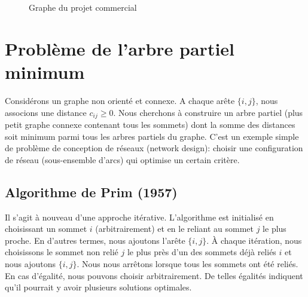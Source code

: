 \begin{example}
\begin{table}[htb]
\begin{center}
\label{tab:project}
\end{center}
\end{table}
\begin{figure}[htb]
\begin{center}
\caption{Graphe du projet commercial}
\label{fig:project}
\end{center}
\end{figure}
\end{example}

\section{Problème de l'arbre partiel minimum}

Considérons un graphe non orienté et connexe.
A chaque arête $\lbrace i,j \rbrace$, nous associons une distance $c_{ij} \geq 0$.
Nous cherchons à construire un arbre partiel (plus petit graphe connexe contenant tous les sommets) dont
la somme des distances soit minimum parmi tous les arbres partiels du graphe.
C'est un exemple simple de problème de conception de réseaux (network design): choisir une
configuration de réseau (sous-ensemble d'arcs) qui optimise un certain critère.

\subsection{Algorithme de Prim (1957)}

Il s'agit à nouveau d'une approche itérative.
L'algorithme est initialisé en choisissant un sommet $i$ (arbitrairement) et en le reliant au sommet $j$ le plus proche.
En d'autres termes, nous ajoutons l'arête $\lbrace i,j \rbrace$.
À chaque itération, nous choisissons le sommet non relié $j$ le plus près d'un des sommets déjà reliés $i$ et nous ajoutons
$\lbrace i,j \rbrace$.
Nous nous arrêtons lorsque tous les sommets ont été reliés.
En cas d'égalité, nous pouvons choisir arbitrairement.
De telles égalités indiquent qu'il pourrait y avoir plusieurs solutions optimales.


